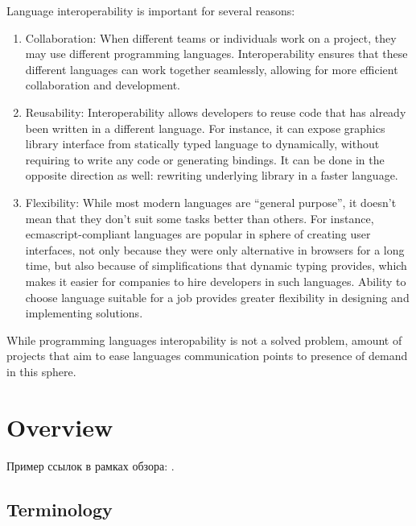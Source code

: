 \documentclass[times, %
               specification,annotation, %
               titlepage-extra-ru,specification-extra-ru,annotation-extra-ru, %
               languages={russian,english} %
              ]{itmo-student-thesis}
\begin{document}
\tableofcontents

\startprefacepage

Language interoperability is important for several reasons:

\begin{enumerate}
\item Collaboration: When different teams or individuals work on a project, they may use different programming languages. Interoperability ensures that these different languages can work together seamlessly, allowing for more efficient collaboration and development.

\item Reusability: Interoperability allows developers to reuse code that has already been written in a different language. For instance, it can expose graphics library interface from statically typed language to dynamically, without requiring to write any code or generating bindings. It can be done in the opposite direction as well: rewriting underlying library in a faster language.

\item Flexibility: While most modern languages are ``general purpose'', it doesn't mean that they don't suit some tasks better than others. For instance, ecmascript-compliant languages are popular in sphere of creating user interfaces, not only because they were only alternative in browsers for a long time, but also because of simplifications that dynamic typing provides, which makes it easier for companies to hire developers in such languages. Ability to choose language suitable for a job provides greater flexibility in designing and implementing solutions.
\end{enumerate}

While programming languages interopability is not a solved problem, amount of projects that aim to ease languages communication points to presence of demand in this sphere.

\chapter{Overview}

\startrelatedwork
Пример ссылок в рамках обзора: \cite{example-english, example-russian, unrestricted-jump-evco, doerr-doerr-lambda-lambda-self-adjustment-arxiv}.

\section{Terminology}
\TODO
\end{document}
